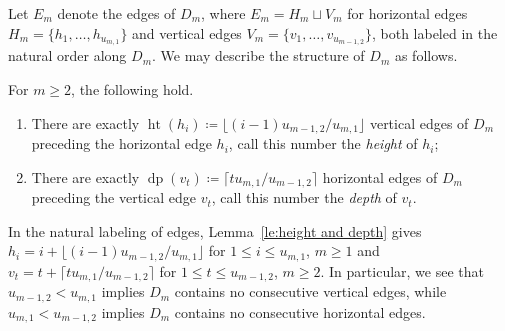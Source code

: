 \documentclass[ALCO,ThmDefs,Unicode,epreuves]{cedram}
\DeclareMathOperator{\hgt}{ht}
\DeclareMathOperator{\dpt}{dp}
\begin{document}
Let $E_m$ denote the edges of $D_m$, where $E_m=H_m\sqcup V_m$ for horizontal edges $H_m=\{h_1,\ldots,h_{u_{m,1}}\}$ and vertical edges $V_m=\{v_1,\ldots,v_{u_{m-1,2}}\}$, both labeled in the natural order along $D_m$. 
We may describe the structure of $D_m$ as follows.
\begin{lemma}
 \label{le:height and depth}
 For $m\ge2$, the following hold.
 \begin{enumerate}[label=(\alph*)]
 \item There are exactly $\hgt(h_i)\coloneqq \lfloor (i-1)u_{m-1,2}/u_{m,1}\rfloor$ vertical edges of $D_m$ preceding the horizontal edge $h_i$, call this number the \emph{height} of $h_i$;
 \item There are exactly $\dpt(v_t)\coloneqq \lceil tu_{m,1}/u_{m-1,2}\rceil$ horizontal edges of $D_m$ preceding the vertical edge $v_t$, call this number the \emph{depth} of $v_t$.
 \end{enumerate}
\end{lemma}
In the natural labeling of edges, Lemma~\ref{le:height and depth} gives $h_i=i+\lfloor (i-1)u_{m-1,2}/u_{m,1}\rfloor$ for $1\le i\le u_{m,1}$, $m\ge1$ and $v_t=t+\lceil tu_{m,1}/u_{m-1,2}\rceil$ for $1\le t\le u_{m-1,2}$, $m\ge2$. 
In particular, we see that $u_{m-1,2}<u_{m,1}$ implies $D_m$ contains no consecutive vertical edges, while $u_{m,1}<u_{m-1,2}$ implies $D_m$ contains no consecutive horizontal edges. 
\end{document}
